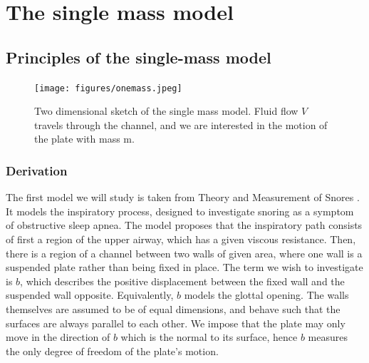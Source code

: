 



%

\chapter{The single mass model}

\section{Principles of the single-mass model}

\begin{figure}[h!]
	\centering
	\texttt{[image: figures/onemass.jpeg]}
	\caption{
		Two dimensional sketch of the single mass model.
		Fluid flow $V$ travels through the channel,
		and we are interested in the motion of the plate with mass $\mathrm{m}$.
	}
\end{figure}

\subsection{Derivation}

The first model we will study is taken from Theory and Measurement of Snores \citep{gavriely_jensen_1993}.
It models the inspiratory process, designed to investigate snoring as a symptom of obstructive sleep apnea.
The model proposes that the inspiratory path consists of first a region of the upper airway,
which has a given viscous resistance.
Then, there is a region of a channel between two walls of given area, where one wall is a suspended plate rather than being fixed in place.
The term we wish to investigate is $b$, which describes the positive displacement between the fixed wall and the suspended wall opposite.
Equivalently, $b$ models the glottal opening.
The walls themselves are assumed to be of equal dimensions, and behave such that the surfaces are always parallel to each other.
We impose that the plate may only move in the direction of $b$ which is the normal to its surface,
hence $b$ measures the only degree of freedom of the plate's motion.

